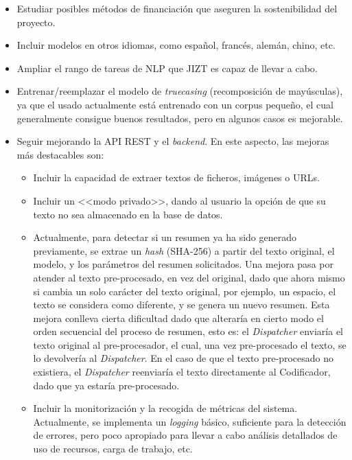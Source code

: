 \vspace{-0.3cm}
\begin{itemize}[\textbullet]
	\item Estudiar posibles métodos de financiación que aseguren la sostenibilidad del proyecto.
	
	\item Incluir modelos en otros idiomas, como español, francés, alemán, chino, etc.
	\item Ampliar el rango de tareas de NLP que JIZT es capaz de llevar a cabo.
	\item Entrenar/reemplazar el modelo de \emph{truecasing} (recomposición de mayúsculas), ya que el usado actualmente está entrenado con un corpus pequeño, el cual generalmente consigue buenos resultados, pero en algunos casos es mejorable.
	\item Seguir mejorando la API REST y el \emph{backend}. En este aspecto, las mejoras más destacables son:
	\begin{itemize}[◦]
		\item Incluir la capacidad de extraer textos de ficheros, imágenes o URLs.
		
		\item Incluir un <<modo privado>>, dando al usuario la opción de que su texto no sea almacenado en la base de datos.
		
		\item Actualmente, para detectar si un resumen ya ha sido generado previamente, se extrae un \emph{hash} (SHA-256) a partir del texto original, el modelo, y los parámetros del resumen solicitados. Una mejora pasa por atender al texto pre-procesado, en vez del original, dado que ahora mismo si cambia un solo carácter del texto original, por ejemplo, un espacio, el texto se considera como diferente, y se genera un nuevo resumen. Esta mejora conlleva cierta dificultad dado que alteraría en cierto modo el orden secuencial del proceso de resumen, esto es: el \emph{Dispatcher} enviaría el texto original al pre-procesador, el cual, una vez pre-procesado el texto, se lo devolvería al \emph{Dispatcher}. En el caso de que el texto pre-procesado no existiera, el \emph{Dispatcher} reenviaría el texto directamente al Codificador, dado que ya estaría pre-procesado.
		
		\item Incluir la monitorización y la recogida de métricas del sistema. Actualmente, se implementa un \emph{logging} básico, suficiente para la detección de errores, pero poco apropiado para llevar a cabo análisis detallados de uso de recursos, carga de trabajo, etc.
		

\end{itemize}
\end{itemize}

